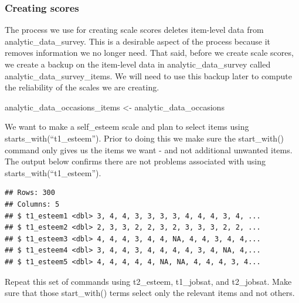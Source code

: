 \documentclass[
]{krantz}
\makeatletter
\newenvironment{Shaded}{\begin{snugshade}}{\end{snugshade}}
\newcommand{\KeywordTok}[1]{\textcolor[rgb]{0.27,0.27,0.27}{\textbf{#1}}}
\newcommand{\NormalTok}[1]{#1}
\newcommand{\OperatorTok}[1]{\textcolor[rgb]{0.43,0.43,0.43}{\textbf{#1}}}
\newcommand{\StringTok}[1]{\textcolor[rgb]{0.5,0.5,0.5}{#1}}
\newenvironment{kframe}{%
\medskip{}
\setlength{\fboxsep}{.8em}
 \def\at@end@of@kframe{}%
 \ifinner\ifhmode%
  \def\at@end@of@kframe{\end{minipage}}%
  \begin{minipage}{\columnwidth}%
 \fi\fi%
 \def\FrameCommand##1{\hskip\@totalleftmargin \hskip-\fboxsep
 \colorbox{shadecolor}{##1}\hskip-\fboxsep
     \hskip-\linewidth \hskip-\@totalleftmargin \hskip\columnwidth}%
 \MakeFramed {\advance\hsize-\width
   \@totalleftmargin\z@ \linewidth\hsize
   \@setminipage}}%
 {\par\unskip\endMakeFramed%
 \at@end@of@kframe}
\renewenvironment{Shaded}{\begin{kframe}}{\end{kframe}}
\makeatother
\begin{document}
\hypertarget{creating-scores-1}{%
\subsubsection{Creating scores}\label{creating-scores-1}}

The process we use for creating scale scores deletes item-level data from analytic\_data\_survey. This is a desirable aspect of the process because it removes information we no longer need. That said, before we create scale scores, we create a backup on the item-level data in analytic\_data\_survey called analytic\_data\_survey\_items. We will need to use this backup later to compute the reliability of the scales we are creating.

\begin{Shaded}
\begin{Highlighting}[]
\NormalTok{analytic_data_occasions_items <-}\StringTok{ }\NormalTok{analytic_data_occasions}
\end{Highlighting}
\end{Shaded}

We want to make a self\_esteem scale and plan to select items using starts\_with(``t1\_esteem''). Prior to doing this we make sure the start\_with() command only gives us the items we want - and not additional unwanted items. The output below confirms there are not problems associated with using starts\_with(``t1\_esteem'').

\begin{Shaded}
\end{Shaded}

\begin{verbatim}
## Rows: 300
## Columns: 5
## $ t1_esteem1 <dbl> 3, 4, 4, 3, 3, 3, 3, 4, 4, 4, 3, 4, ...
## $ t1_esteem2 <dbl> 2, 3, 3, 2, 2, 3, 2, 3, 3, 3, 2, 2, ...
## $ t1_esteem3 <dbl> 4, 4, 4, 3, 4, 4, NA, 4, 4, 3, 4, 4,...
## $ t1_esteem4 <dbl> 3, 4, 4, 3, 4, 4, 4, 4, 3, 4, NA, 4,...
## $ t1_esteem5 <dbl> 4, 4, 4, 4, 4, NA, NA, 4, 4, 4, 3, 4...
\end{verbatim}

Repeat this set of commands using t2\_esteem, t1\_jobsat, and t2\_jobsat. Make sure that those start\_with() terms select only the relevant items and not others.
\end{document}
